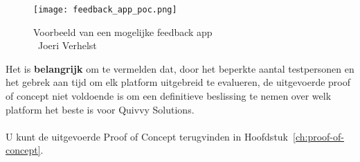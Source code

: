 \begin{figure}[H]
    \centering
    \texttt{[image: feedback\_app\_poc.png]}
    \caption[Voorbeeld van een mogelijke feedback app]{Voorbeeld van een mogelijke feedback app\\\textcopyright\ Joeri Verhelst}
    \label{fig:feedback_app}
\end{figure}
Het is \textbf{belangrijk} om te vermelden dat, door het beperkte aantal testpersonen en het gebrek aan tijd om elk platform uitgebreid te evalueren, 
de uitgevoerde proof of concept niet voldoende is om een definitieve beslissing te nemen over welk platform het beste is voor Quivvy Solutions.
\\
\\
U kunt de uitgevoerde Proof of Concept terugvinden in Hoofdstuk~\ref{ch:proof-of-concept}.









